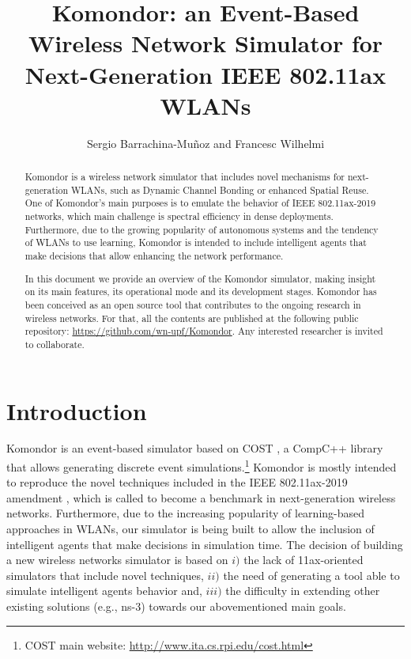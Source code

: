 \documentclass[a4paper]{article}
\title{Komondor: an Event-Based Wireless Network Simulator for Next-Generation IEEE 802.11ax WLANs}
\author{Sergio Barrachina-Mu\~noz and Francesc Wilhelmi}
\begin{document}
\maketitle

\begin{abstract}
Komondor is a wireless network simulator that includes novel mechanisms for next-generation WLANs, such as Dynamic Channel Bonding or enhanced Spatial Reuse. One of Komondor's main purposes is to emulate the behavior of IEEE 802.11ax-2019 networks, which main challenge is spectral efficiency in dense deployments. Furthermore, due to the growing popularity of autonomous systems and the tendency of WLANs to use learning, Komondor is intended to include intelligent agents that make decisions that allow enhancing the network performance. 

In this document we provide an overview of the Komondor simulator, making insight on its main features, its operational mode and its development stages. Komondor has been conceived as an open source tool that contributes to the ongoing research in wireless networks. For that, all the contents are published at the following public repository: \url{https://github.com/wn-upf/Komondor}. Any interested researcher is invited to collaborate.
\end{abstract}

\tableofcontents

\listoffigures

\listoftables

\section{Introduction}
\label{section:introduction}
	Komondor \cite{barrachina2017komondor} is an event-based simulator based on COST \cite{chen2002reusing}, a CompC++ library that allows generating discrete event simulations.\footnote{COST main website: \url{http://www.ita.cs.rpi.edu/cost.html}} Komondor is mostly intended to reproduce the novel techniques included in the IEEE 802.11ax-2019 amendment \cite{tgax2017draft}, which is called to become a benchmark in next-generation wireless networks. Furthermore, due to the increasing popularity of learning-based approaches in WLANs, our simulator is being built to allow the inclusion of intelligent agents that make decisions in simulation time. The decision of building a new wireless networks simulator is based on $i)$ the lack of 11ax-oriented simulators that include novel techniques, $ii)$ the need of generating a tool able to simulate intelligent agents behavior and, $iii)$ the difficulty in extending other existing solutions (e.g., ns-3) towards our abovementioned main goals. 
	
\end{document}
